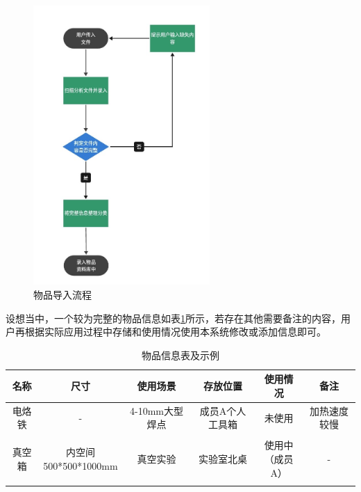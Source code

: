 \documentclass[zihao=-4]{ctexart}
\begin{document}
\begin{spacing}{1.5}
\begin{figure}[H]
    \centering %
    \includegraphics[width=0.6\textwidth]{物品信息导入.jpg} %
    \caption{物品导入流程} %
    \label{example_label} %
\end{figure}
设想当中，一个较为完整的物品信息如表\ref{a}所示，若存在其他需要备注的内容，用户再根据实际应用过程中存储和使用情况使用本系统修改或添加信息即可。
\begin{table}[H]
\small
\caption{物品信息表及示例}
\centering
\begin{tabular}{cccccc}
\hline  
\textbf{名称} & \textbf{尺寸} & \textbf{使用场景} & \textbf{存放位置} & \textbf{使用情况} & \textbf{备注} \\ 
\hline  
电烙铁 & -  & 4-10mm大型焊点  & 成员A个人工具箱  & 未使用 & 加热速度较慢\\
\\
真空箱 & \makecell{内空间\\500*500*1000mm} & 真空实验 & 实验室北桌  & \makecell{使用中\\（成员A）} & -\\
\hline
\label{a}
\end{tabular} 
\end{table}


\end{spacing}
\end{document}
